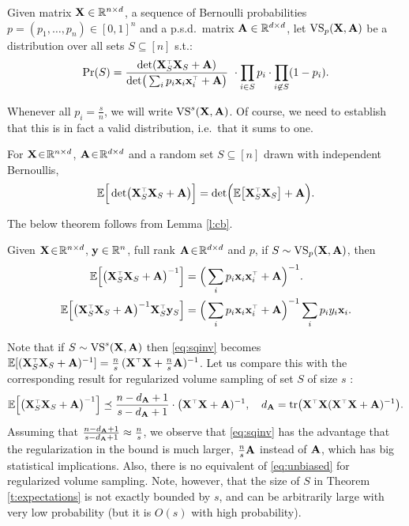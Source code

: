 \documentclass[12pt]{sty/colt2019/colt2018-arxiv}
\begin{document}
\begin{definition}\label{d:r-dpp}
Given matrix $\mathbf X\in\mathbb R^{n\times d}$, a sequence of Bernoulli probabilities $p=(p_1,\dots,p_n)\in[0,1]^n$
and a p.s.d.~matrix $\mathbf A\in\mathbb R^{d\times d}$, let
${\mathrm{VS}}_p(\mathbf X,\mathbf A)$ be a distribution over all sets $S\subseteq [n]$ s.t.:
  \begin{align}
  \Pr(S) = \frac{\det(
  \X_S^\top\X_S+\A)}{\det\!\big(
 \sum_ip_i\x_i\x_i^\top+ \A\big)}\
\cdot \prod_{i\in S}p_{i}\cdot\prod_{i\not\in S}(1-p_i).\label{eq:poisson-prob}
\end{align}
\end{definition}
Whenever all $p_i=\frac sn$, we will write ${\mathrm{VS}}^s(\mathbf X,\mathbf A)$.
Of course, we need to establish that this is in fact a valid
distribution, i.e.~that it sums to one. 
\begin{lemma}\label{l:cb}
For $\mathbf X\!\in\!\mathbb R^{n\times d}$, $\mathbf A\!\in\!\mathbb R^{d\times d}$
and a random set $S\subseteq [n]$ drawn with independent Bernoullis,
\begin{align*}
  \E\Big[\det\!\big(\X_S^\top\X_S+\A\big)\Big]
  = \det\!\Big( \E\big[\X_S^\top\X_S\big]+\A\Big).
\end{align*}
\end{lemma}
The below theorem follows from Lemma \ref{l:cb}.
\begin{theorem}\label{t:expectations}
Given $\mathbf X\!\in\!\mathbb R^{n\times d}$, $\mathbf y\in\mathbb R^n$, full rank
$\mathbf A\!\in\!\mathbb R^{d\times d}$ and $p$,
if $S\sim {\mathrm{VS}}_p(\mathbf X,\mathbf A)$, then
\begin{align}
  \E\Big[\big(\X_S^\top\X_S+\A\big)^{-1}\Big]
  &= \Big(
  \sum_ip_i\x_i\x_i^\top +\A \Big)^{-1}.\label{eq:sqinv}
  \\
  \E\Big[\big(\X_S^\top\X_S+\A\big)^{-1}\X_S^\top\y_S\Big]
  &=\Big( \sum_ip_i\x_i\x_i^\top +\A\Big)^{-1}\sum_ip_iy_i\x_i.\label{eq:unbiased}
\end{align}
\end{theorem}
Note that if $S\sim{\mathrm{VS}}^s(\mathbf X,\mathbf A)$ then \eqref{eq:sqinv} becomes $\E[(\X_S^\top\X_S+\A)^{-1}] =
\frac ns\, (\X^\top\X+\frac ns\A)^{-1}$.
Let us compare this with the corresponding result for
regularized volume sampling of set $S$ of size $s$
\citep[extension of Theorem 16 in][]{unbiased-estimates-journal}:
\begin{align*}
  \E\Big[\big(\X_S^\top\X_S+\A\big)^{-1}\Big]\preceq
  \frac{n-d_{\A}+1}{s-d_{\A}+1}\cdot\big(\X^\top\X+\A)^{-1},\quad
  d_{\A}=\tr\big(\X^\top\X(\X^\top\X+\A)^{-1}\big).
\end{align*}
Assuming that $\frac{n-d_{\mathbf A}+1}{s-d_{\mathbf A}+1}\approx \frac ns$, we
observe that \eqref{eq:sqinv} has the advantage that the
regularization in the bound is much larger, $\frac ns\mathbf A$ instead of
$\mathbf A$, which has big statistical implications.  Also, there is no
equivalent of \eqref{eq:unbiased} for regularized volume sampling. Note, however,
that the size of $S$ in Theorem \ref{t:expectations} is not
exactly bounded by $s$, and can be arbitrarily large with very low
probability (but it is $O(s)$ with high probability). 
\end{document}
